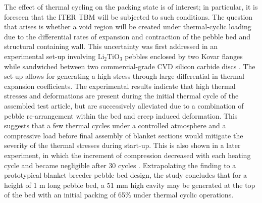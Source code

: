 The effect of thermal cycling on the packing state is of interest; in particular, it is foreseen that the ITER TBM will be subjected to such conditions. The question that arises is whether a void region will be created under thermal-cyclic loading due to the differential rates of expansion and contraction of the pebble bed and structural containing wall. This uncertainty was first addressed in an experimental set-up involving Li$_2$TiO$_3$ pebbles enclosed by two Kovar flanges while sandwiched between two commercial-grade CVD silicon carbide discs \cite{Calderoni:2006ye}. The set-up allows for generating a high stress through large differential in thermal expansion coefficients. The experimental results indicate that high thermal stresses and deformations are present during the initial thermal cycle of the assembled test article, but are successively alleviated due to a combination of pebble re-arrangement within the bed and creep induced deformation. This suggests that a few thermal cycles under a controlled atmosphere and a compressive load before final assembly of blanket sections would mitigate the severity of the thermal stresses during start-up. This is also shown in a later experiment, in which the increment of compression decreased with each heating cycle and became negligible after 30 cycles \cite{Tanigawa:2010cr}. Extrapolating the finding to a prototypical blanket breeder pebble bed design, the study concludes that for a height of 1 m long pebble bed, a 51 mm high cavity may be generated at the top of the bed with an initial packing of 65\% under thermal cyclic operations.  


